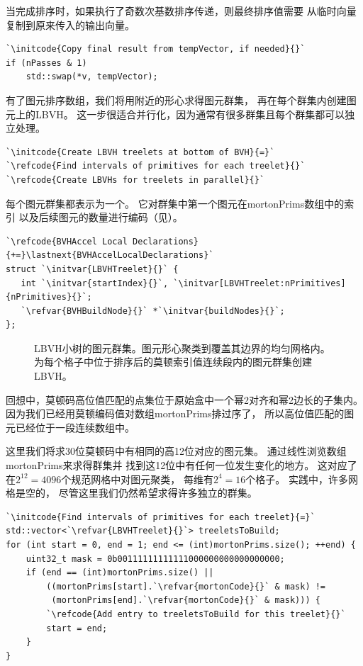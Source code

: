 当完成排序时，如果执行了奇数次基数排序传递，则最终排序值需要
从临时向量复制到原来传入的输出向量。
\begin{lstlisting}
`\initcode{Copy final result from tempVector, if needed}{}`
if (nPasses & 1)
    std::swap(*v, tempVector);
\end{lstlisting}

有了图元排序数组，我们将用附近的形心求得图元群集，
再在每个群集内创建图元上的LBVH。
这一步很适合并行化，因为通常有很多群集且每个群集都可以独立处理。
\begin{lstlisting}
`\initcode{Create LBVH treelets at bottom of BVH}{=}`
`\refcode{Find intervals of primitives for each treelet}{}`
`\refcode{Create LBVHs for treelets in parallel}{}`
\end{lstlisting}

每个图元群集都表示为一个。
它对群集中第一个图元在{\ttfamily mortonPrims}数组中的索引
以及后续图元的数量进行编码（见）。
\begin{lstlisting}
`\refcode{BVHAccel Local Declarations}{+=}\lastnext{BVHAccelLocalDeclarations}`
struct `\initvar{LBVHTreelet}{}` {
   int `\initvar{startIndex}{}`, `\initvar[LBVHTreelet:nPrimitives]{nPrimitives}{}`;
   `\refvar{BVHBuildNode}{}` *`\initvar{buildNodes}{}`;
};
\end{lstlisting}

\begin{figure}[htbp]
    \centering
    \caption{LBVH小树的图元群集。图元形心聚类到覆盖其边界的均匀网格内。
        为每个格子中位于排序后的莫顿索引值连续段内的图元群集创建LBVH。}
    \label{fig:4.12}
\end{figure}

回想中，莫顿码高位值匹配的点集位于原始盒中一个幂2对齐和幂2边长的子集内。
因为我们已经用莫顿编码值对数组{\ttfamily mortonPrims}排过序了，
所以高位值匹配的图元已经位于一段连续数组中。

这里我们将求30位莫顿码中有相同的高12位对应的图元集。
通过线性浏览数组{\ttfamily mortonPrims}来求得群集并
找到这12位中有任何一位发生变化的地方。
这对应了在$2^{12}=4096$个规范网格中对图元聚类，
每维有$2^4=16$个格子。
实践中，许多网格是空的，
尽管这里我们仍然希望求得许多独立的群集。
\begin{lstlisting}
`\initcode{Find intervals of primitives for each treelet}{=}`
std::vector<`\refvar{LBVHTreelet}{}`> treeletsToBuild;
for (int start = 0, end = 1; end <= (int)mortonPrims.size(); ++end) {
    uint32_t mask = 0b00111111111111000000000000000000;
    if (end == (int)mortonPrims.size() ||
        ((mortonPrims[start].`\refvar{mortonCode}{}` & mask) !=
         (mortonPrims[end].`\refvar{mortonCode}{}` & mask))) {
        `\refcode{Add entry to treeletsToBuild for this treelet}{}`
        start = end;
    }
}
\end{lstlisting}


